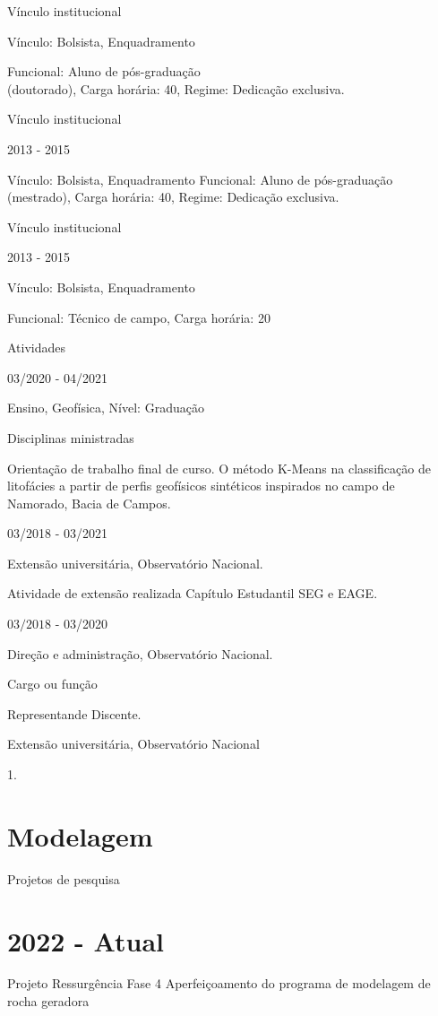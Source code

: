 \documentclass[10pt]{article}
\begin{document}
Vínculo institucional

Vínculo: Bolsista, Enquadramento

Funcional: Aluno de pós-graduação\\
(doutorado), Carga horária: 40, Regime: Dedicação exclusiva.

Vínculo institucional

2013 - 2015

Vínculo: Bolsista, Enquadramento Funcional: Aluno de pós-graduação (mestrado), Carga horária: 40, Regime: Dedicação exclusiva.

Vínculo institucional

2013 - 2015

Vínculo: Bolsista, Enquadramento

Funcional: Técnico de campo, Carga horária: 20

Atividades

03/2020 - 04/2021

Ensino, Geofísica, Nível: Graduação

Disciplinas ministradas

Orientação de trabalho final de curso. O método K-Means na classificação de litofácies a partir de perfis geofísicos sintéticos inspirados no campo de Namorado, Bacia de Campos.

03/2018 - 03/2021

Extensão universitária, Observatório Nacional.

Atividade de extensão realizada Capítulo Estudantil SEG e EAGE.

$03 / 2018$ - 03/2020

Direção e administração, Observatório Nacional.

Cargo ou função

Representande Discente.

Extensão universitária, Observatório Nacional

1.

\section*{Modelagem}
Projetos de pesquisa

\section*{2022 - Atual}
Projeto Ressurgência Fase 4 Aperfeiçoamento do programa de modelagem de rocha geradora
\end{document}
